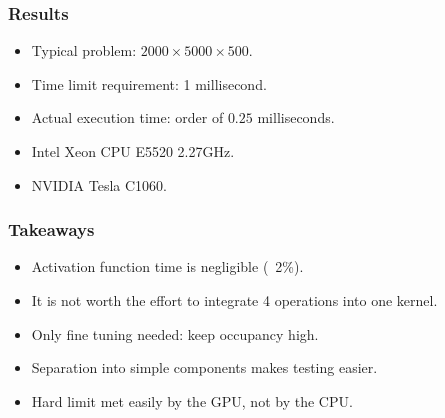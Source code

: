 \begin{frame}
  \frametitle{Results}
  \begin{itemize}
    \item Typical problem: \(2000\times5000\times 500\).
    \item Time limit requirement: 1 millisecond.
    \item Actual execution time: order of \(0.25\) milliseconds.
    \item Intel Xeon CPU E5520 2.27GHz.
    \item NVIDIA Tesla C1060.
  \end{itemize}
\end{frame}

\begin{frame}
  \frametitle{Takeaways}
  \begin{itemize}
    \item Activation function time is negligible (~2\%).
    \item It is not worth the effort to integrate 4 operations into one kernel.
    \item Only fine tuning needed: keep occupancy high.
    \item Separation into simple components makes testing easier.
    \item Hard limit met easily by the GPU, not by the CPU.
  \end{itemize}
\end{frame}



